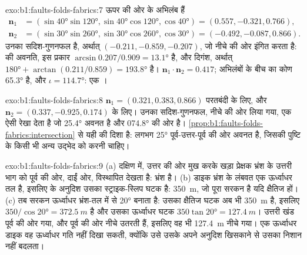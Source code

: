 \begin{solution}{exo:b1:faults-folds-fabrics:7}
ऊपर की ओर के अभिलंब हैं
\begin{align*}
  \mathbf n_1 &= (\sin\ang{40}\sin\ang{120}, \sin\ang{40}\cos\ang{120}, \cos\ang{40}) = (0.557, -0.321, 0.766),\\
  \mathbf n_2 &= (\sin\ang{30}\sin\ang{260}, \sin\ang{30}\cos\ang{260}, \cos\ang{30}) = (-0.492, -0.087, 0.866).
\end{align*}
उनका सदिश-गुणनफल है, अर्थात्
$(-0.211, -0.859, -0.207)$, जो नीचे की ओर इंगित करता है:  की अवनति, इस प्रकार $\arcsin 0.207/0.909 = \ang{13.1}$ है, और दिगंश, अर्थात् $\ang{180} + \arctan(0.211/0.859) =
\ang{193.8}$ है। $\mathbf n_1\cdot\mathbf n_2 = 0.417$; अभिलंबों के बीच का कोण \ang{65.3} है, और $\iota = \ang{114.7}$: एक ।
\end{solution}

\begin{solution}{exo:b1:faults-folds-fabrics:8}
$\mathbf n_1 = (0.321, 0.383, 0.866)$ परतबंदी के लिए, और
$\mathbf n_2 = (0.337, -0.925, 0.174)$  के लिए। उनका सदिश-गुणनफल, नीचे की ओर लिया गया, एक ऐसी रेखा देता है जो \ang{25.4} अवनत है और \ang{074.8} की ओर है। \cref{prop:b1:faults-folds-fabrics:intersection} से यही  की दिशा है:  लगभग \ang{25} पूर्व-उत्तर-पूर्व की ओर अवनत है, जिसकी पुष्टि  के किसी भी अन्य उद्भेद को करनी चाहिए।
\end{solution}

\begin{solution}{exo:b1:faults-folds-fabrics:9}
(a) दक्षिण में, उत्तर की ओर मुख करके खड़ा प्रेक्षक भ्रंश के उत्तरी भाग को पूर्व की ओर, दाईं ओर, विस्थापित देखता है: भ्रंश  है। (b) डाइक भ्रंश के लंबवत एक ऊर्ध्वाधर तल है, इसलिए  के अनुदिश उसका  स्ट्राइक-स्लिप घटक है: \qty{350}{m}, जो पूरा सरकन है यदि  क्षैतिज हों। (c) तब सरकन ऊर्ध्वाधर भ्रंश-तल में  से \ang{20} बनाता है: उसका क्षैतिज घटक अब भी \qty{350}{m} है, इसलिए  $350/\cos\ang{20} = \qty{372.5}{m}$ है और उसका ऊर्ध्वाधर घटक $350\tan\ang{20} = \qty{127.4}{m}$। उत्तरी खंड पूर्व की ओर गया, और  पूर्व की ओर नीचे उतरती हैं, इसलिए वह भी \qty{127.4}{m} नीचे गया। एक ऊर्ध्वाधर डाइक वह ऊर्ध्वाधर गति नहीं दिखा सकती, क्योंकि उसे उसके अपने अनुदिश खिसकाने से उसका निशान नहीं बदलता।
\end{solution}


